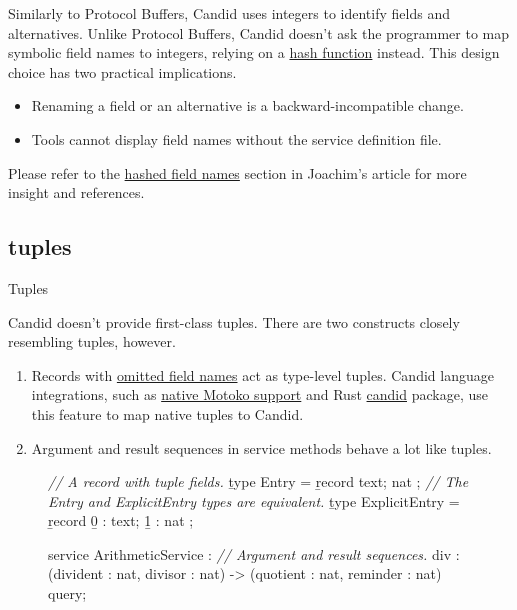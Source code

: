 \documentclass{article}
\begin{document}
Similarly to Protocol Buffers, Candid uses integers to identify fields and alternatives.
Unlike Protocol Buffers, Candid doesn't ask the programmer to map symbolic field names to integers, relying on a \href{https://github.com/dfinity/candid/blob/master/spec/Candid.md#shorthand-symbolic-field-ids}{hash function} instead.
This design choice has two practical implications.

\begin{itemize}
    \item
    Renaming a field or an alternative is a backward-incompatible change.
    \item
    Tools cannot display field names without the service definition file.
\end{itemize}

Please refer to the \href{https://www.joachim-breitner.de/blog/786-A_Candid_explainer__Quirks#hashed-field-names}{hashed field names} section in Joachim's article for more insight and references.

\subsection{tuples}{Tuples}

Candid doesn't provide first-class tuples.
There are two constructs closely resembling tuples, however.

\begin{enumerate}
    \item
    Records with \href{https://github.com/dfinity/candid/blob/master/spec/Candid.md#shorthand-tuple-fields}{omitted field names} act as type-level tuples.
    Candid language integrations, such as \href{https://internetcomputer.org/docs/current/developer-docs/backend/candid/candid-howto#interact-with-a-service-from-a-motoko-canister}{native Motoko support} and Rust \href{https://crates.io/crates/candid}{candid} package, use this feature to map native tuples to Candid.
    \item
    Argument and result sequences in service methods behave a lot like tuples.
\end{enumerate}

\begin{figure}
\begin{code}[candid]
\emph{// A record with tuple fields.}
\b{type} Entry  = \b{record} { text; nat };
\emph{// The Entry and ExplicitEntry types are equivalent.}
\b{type} ExplicitEntry = \b{record} { \b{0} : text; \b{1} : nat };

service ArithmeticService : {
  \emph{// Argument and result sequences.}
  div : (divident : nat, divisor : nat) -> (quotient : nat, reminder : nat) query;
}
\end{code}
\end{figure}
\end{document}

